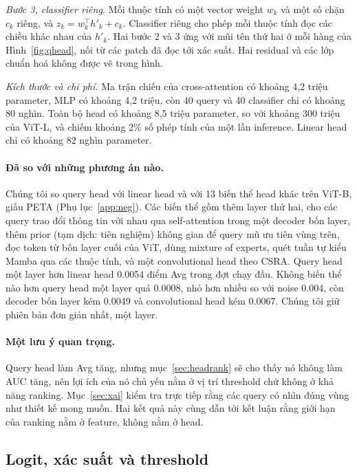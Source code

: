 \documentclass[11pt,a4paper]{article}
\begin{document}
\textit{Bước 3, classifier riêng.} Mỗi thuộc tính có một vector weight $w_k$ và một số chặn $c_k$ riêng, và $z_k = w_k^\top h'_k + c_k$. Classifier riêng cho phép mỗi thuộc tính đọc các chiều khác nhau của $h'_k$. Hai bước 2 và 3 ứng với mũi tên thứ hai ở mỗi hàng của Hình~\ref{fig:qhead}, nối từ các patch đã đọc tới xác suất. Hai residual và các lớp chuẩn hoá không được vẽ trong hình.

\textit{Kích thước và chi phí.} Ma trận chiếu của cross-attention có khoảng 4,2 triệu parameter, MLP có khoảng 4,2 triệu, còn 40 query và 40 classifier chỉ có khoảng 80 nghìn. Toàn bộ head có khoảng 8,5 triệu parameter, so với khoảng 300 triệu của ViT-L, và chiếm khoảng 2\% số phép tính của một lần inference. Linear head chỉ có khoảng 82 nghìn parameter.

\paragraph{Đã so với những phương án nào.} Chúng tôi so query head với linear head và với 13 biến thể head khác trên ViT-B, giấu PETA (Phụ lục~\ref{app:neg}). Các biến thể gồm thêm layer thứ hai, cho các query trao đổi thông tin với nhau qua self-attention trong một decoder bốn layer, thêm prior (tạm dịch: tiên nghiệm) không gian để query mũ ưu tiên vùng trên, đọc token từ bốn layer cuối của ViT, dùng mixture of experts, quét tuần tự kiểu Mamba qua các thuộc tính, và một convolutional head theo CSRA. Query head một layer hơn linear head 0.0054 điểm Avg trong đợt chạy đầu. Không biến thể nào hơn query head một layer quá 0.0008, nhỏ hơn nhiều so với noise 0.004, còn decoder bốn layer kém 0.0049 và convolutional head kém 0.0067. Chúng tôi giữ phiên bản đơn giản nhất, một layer.

\paragraph{Một lưu ý quan trọng.} Query head làm Avg tăng, nhưng mục~\ref{sec:headrank} sẽ cho thấy nó không làm AUC tăng, nên lợi ích của nó chủ yếu nằm ở vị trí threshold chứ không ở khả năng ranking. Mục~\ref{sec:xai} kiểm tra trực tiếp rằng các query có nhìn đúng vùng như thiết kế mong muốn. Hai kết quả này cùng dẫn tới kết luận rằng giới hạn của ranking nằm ở feature, không nằm ở head.

\subsection{Logit, xác suất và threshold}
\end{document}
